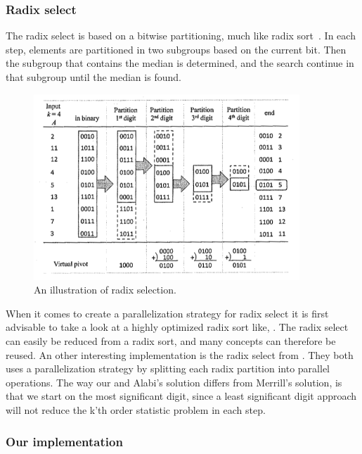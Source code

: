 \subsubsection{Radix select} %
\label{ssub:radix_select}

The radix select is based on a bitwise partitioning, much like radix sort~\cite[Chapter 8.3]{Cormen:2001}. In each step, elements are partitioned in two subgroups based on the current bit. Then the subgroup that contains the median is determined, and the search continue in that subgroup until the median is found.

\begin{figure}[ht!]
\centering
\includegraphics[width=100mm]{../gfx/Radix_select.png}

\caption{An illustration of radix selection\cite{cayman:2012}.}
\label{fig:radix_select}
\end{figure}

When it comes to create a parallelization strategy for radix select it is first advisable to take a look at a highly optimized radix sort like, \citep{MerrillG11}. The radix select can easily be reduced from a radix sort, and many concepts can therefore be reused. An other interesting implementation is the radix select from \citep{Alabi:2012}. They both uses a parallelization strategy by splitting each radix partition into parallel operations. The way our and Alabi's solution differs from Merrill's solution, is that we start on the most significant digit, since a least significant digit approach will not reduce the k'th order statistic problem in each step.

\subsubsection{Our implementation} %
\label{ssub:our_implementation}

